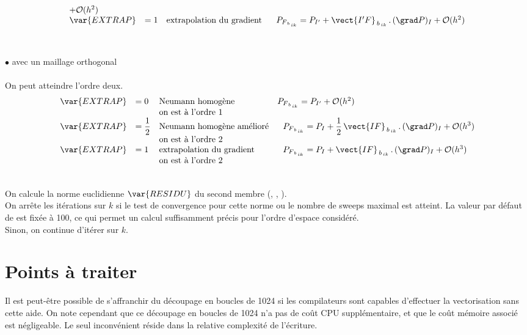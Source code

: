 {\begin{equation}
\begin{array}{llll}
+ \mathcal{O}(h^2)\\
\var{EXTRAP} &= 1&\text{extrapolation du gradient}&\ \
P_{F_{\,b_{\,ik}}} = P_{I'} + \vect{I'F}_{\,b_{\,ik}}\,.\,(\grad P)_{I} + \mathcal{O}(h^2)\\
\end{array}
\end{equation}\\\\
\hspace*{2cm}$\bullet $ avec un maillage orthogonal \\\\
On peut atteindre l'ordre deux.\\
\begin{equation}\notag
\begin{array}{lllll}
\var{EXTRAP} &= 0 &\text{Neumann homog\`ene}&
P_{F_{\,b_{\,ik}}}  = P_{I'} + \mathcal{O}(h^2)\\
&\ &\text{on est \`a l'ordre 1}\\
\var{EXTRAP} &=  \displaystyle\frac{1}{2} &\text{Neumann homog\`ene am\'elior\'e}&\ \
P_{F_{\,b_{\,ik}}}  = P_{I} + \displaystyle\frac{1}{2}\,\vect{IF}_{\,b_{\,ik}}\,.\,(\grad P)_{I}
+ \mathcal{O}(h^3)\\
&\ &\text{on est \`a l'ordre 2}\\
\var{EXTRAP} &= 1 &\text{extrapolation du gradient}&\ \
P_{F_{\,b_{\,ik}}}  = P_{I} + \vect{IF}_{\,b_{\,ik}}\,.\,(\grad P)_{I} +
\mathcal{O}(h^3)\\
&\ &\text{on est \`a l'ordre 2}\\
\end{array}
\end{equation}

\hspace*{1,5cm}{\bf Test de convergence de la m\'ethode it\'erative de r\'esolution}\\
On calcule la norme euclidienne $\var {RESIDU}$ du second membre (,
, ).\\
On arr\^ete les it\'erations sur $k$ si le test de
convergence pour cette norme ou le nombre de
sweeps maximal  est atteint. La valeur par d\'efaut de   est fix\'ee \`a 100, ce
qui permet un calcul suffisamment pr\'ecis pour l'ordre d'espace
consid\'er\'e.\\
Sinon, on continue d'it\'erer sur $k$.
\section{Points \`a traiter}
Il est peut-\^etre possible de s'affranchir du d\'ecoupage en boucles de 1024 si
les compilateurs sont capables
d'effectuer la vectorisation sans cette aide. On note cependant que ce
d\'ecoupage en boucles de 1024 n'a pas de co\^ut CPU suppl\'ementaire, et que
le co\^ut m\'emoire associ\'e est n\'egligeable.
Le seul inconv\'enient r\'eside dans la relative complexit\'e  de l'\'ecriture.

}
